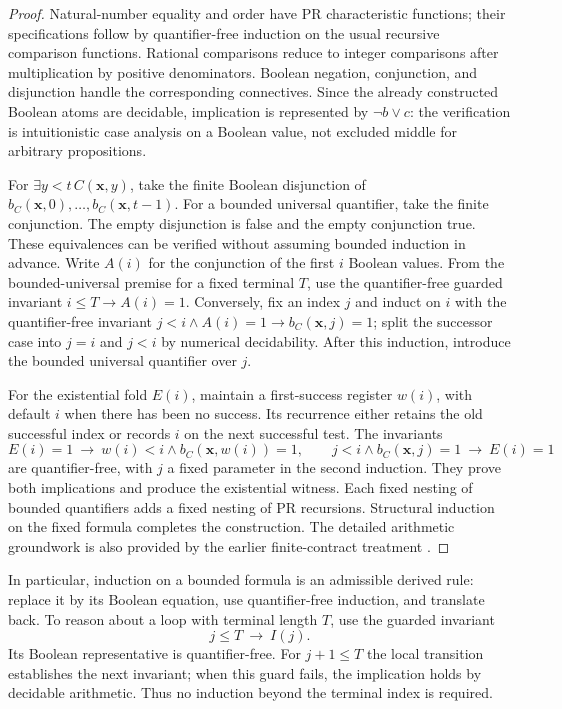 \begin{proof}
Natural-number equality and order have PR characteristic functions;
their specifications follow by quantifier-free induction on the usual
recursive comparison functions. Rational comparisons reduce to integer
comparisons after multiplication by positive denominators. Boolean
negation, conjunction, and disjunction handle the corresponding
connectives. Since the already constructed Boolean atoms are decidable,
implication is represented by $\neg b\vee c$: the verification is
intuitionistic case analysis on a Boolean value, not excluded middle for
arbitrary propositions.

For $\exists y<t\,C(\mathbf x,y)$, take the finite Boolean disjunction
of $b_C(\mathbf x,0),\ldots,b_C(\mathbf x,t-1)$. For a bounded universal
quantifier, take the finite conjunction. The empty disjunction is false
and the empty conjunction true. These equivalences can be verified
without assuming bounded induction in advance. Write $A(i)$ for the
conjunction of the first $i$ Boolean values. From the bounded-universal
premise for a fixed terminal $T$, use the quantifier-free guarded
invariant $i\le T\to A(i)=1$. Conversely, fix an index $j$ and induct
on $i$ with the quantifier-free invariant
$j<i\wedge A(i)=1\to b_C(\mathbf x,j)=1$; split the successor case
into $j=i$ and $j<i$ by numerical decidability. After this induction,
introduce the bounded universal quantifier over $j$.

For the existential fold $E(i)$, maintain a first-success register
$w(i)$, with default $i$ when there has been no success. Its recurrence
either retains the old successful index or records $i$ on the next
successful test. The invariants
\[
 E(i)=1\ \to\ w(i)<i\wedge b_C(\mathbf x,w(i))=1,
 \qquad
 j<i\wedge b_C(\mathbf x,j)=1\ \to\ E(i)=1
\]
are quantifier-free, with $j$ a fixed parameter in the second induction.
They prove both implications and produce the existential witness.
Each fixed nesting of bounded quantifiers adds a fixed nesting of PR
recursions. Structural induction on the fixed formula completes the
construction. The detailed arithmetic groundwork is also provided by
the earlier finite-contract treatment \cite{repo-contracts}.
\end{proof}

In particular, induction on a bounded formula is an admissible derived
rule: replace it by its Boolean equation, use quantifier-free induction,
and translate back. To reason about a loop with terminal length $T$, use
the guarded invariant
\[
                         j\le T\ \longrightarrow\ I(j).
\]
Its Boolean representative is quantifier-free. For $j+1\le T$ the
local transition establishes the next invariant; when this guard fails,
the implication holds by decidable arithmetic. Thus no induction beyond
the terminal index is required.

